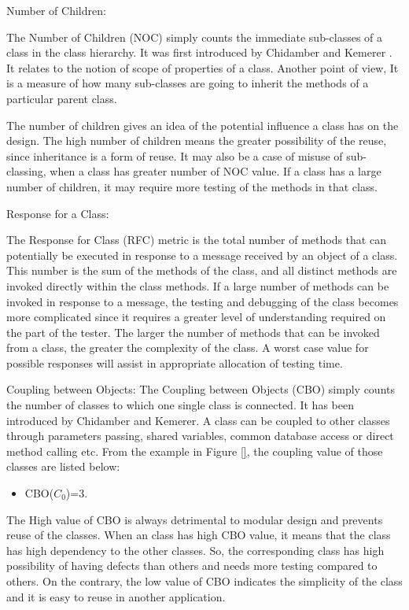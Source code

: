 \documentclass[12pt]{report}
\begin{document}
Number of Children:

The Number of Children (NOC) simply counts the immediate sub-classes of a class in the class hierarchy. It was first introduced by Chidamber and Kemerer \cite{chidamber1994metrics}. It relates to the notion of scope of properties of a class. Another point of view, It is a measure of how many sub-classes are going to inherit the methods of a particular parent class.


The number of children gives an idea of the potential influence a class has on the design. The high number of children means the greater possibility of the reuse, since inheritance is a form of reuse. It may also be a case of misuse of sub-classing, when a class has greater number of NOC value. If a class has a large number of children, it may require more testing of the methods in that class.



Response for a Class:
 
The Response for Class (RFC) metric is the total number of methods that can potentially be executed in response to a message received by an object of a class.  This number is the sum of the methods of the class, and all distinct methods are invoked directly within the class methods. 
If a large number of methods can be invoked in response to a message, the testing and debugging of the class becomes more complicated since it requires a greater level of understanding required on the part of the tester.
The larger the number of methods that can be invoked from a class, the greater the complexity of the class.
A worst case value for possible responses will assist in appropriate allocation of testing time.


Coupling between Objects: 
The Coupling between Objects (CBO) simply counts the number of classes to which one single class is connected. It has been introduced by Chidamber and Kemerer. A class can be coupled to other classes through parameters passing, shared variables, common database access or direct method calling etc. From the example in Figure \ref{}, the coupling value of those classes are listed below: 

\begin{itemize}
	\item CBO($C_{0}$)=3.
\end{itemize}

The High value of CBO is always detrimental to modular design and prevents reuse of the classes. When an class has high CBO value, it means that the class has high dependency to the other classes. So, the corresponding class has high possibility of having defects than others and needs more testing compared to others. On the contrary, the low value of CBO indicates the simplicity of the class and it is easy to reuse in another application. 
\end{document}
